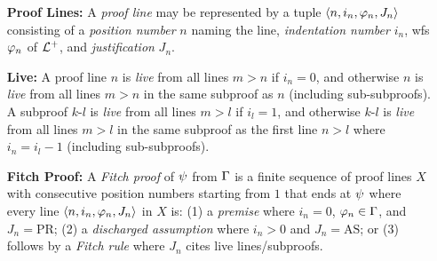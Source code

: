 \documentclass[a4paper, 11pt]{article} %
\begin{document}
\begin{enumerate}
  \item[\bf Proof Lines:] A \textit{proof line} may be represented by a tuple $\langle n,i_n,\varphi_n,J_n\rangle$ consisting of a \textit{position number} $n$ naming the line, \textit{indentation number} $i_n$, wfs $\varphi_n$ of $\mathcal{L}^+$, and \textit{justification} $J_n$. %
  \item[\bf Live:]
    A proof line $n$ is \textit{live} from all lines $m > n$ if $i_n = 0$, and otherwise $n$ is \textit{live} from all lines $m > n$ in the same subproof as $n$ (including sub-subproofs).
    A subproof $k$-$l$ is \textit{live} from all lines $m > l$ if $i_l = 1$, and otherwise $k$-$l$ is \textit{live} from all lines $m > l$ in the same subproof as the first line $n > l$ where $i_n = i_l - 1$ (including sub-subproofs). 
  \item[\bf Fitch Proof:] A \textit{Fitch proof} of $\psi$ from $\Gamma$ is a finite sequence of proof lines $X$ with consecutive position numbers starting from $1$ that ends at $\psi$ where every line $\langle n,i_n,\varphi_n,J_n\rangle$ in $X$ is: (1) a \textit{premise} where $i_n = 0$, $\varphi_n \in \Gamma$, and $J_n = \text{PR}$; (2) a \textit{discharged assumption} where $i_n > 0$ and $J_n = \text{AS}$; or (3) follows by a \textit{Fitch rule} where $J_n$ cites live lines/subproofs.

\end{enumerate}
\end{document}
